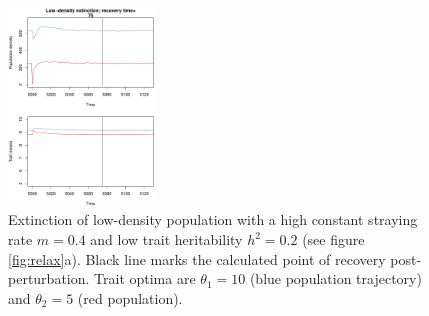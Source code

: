 \documentclass[twocolumn,preprintnumbers,amsmath,amssymb,superscriptaddress]{revtex4}
\newcommand{\beginsupplement}{%
        \clearpage
        \setcounter{table}{0}
        \renewcommand{\thetable}{S\arabic{table}}%
        \setcounter{figure}{0}
        \renewcommand{\thefigure}{S\arabic{figure}}%
     }
\begin{document}










\beginsupplement


\begin{figure}
  \captionsetup{justification=raggedright,
singlelinecheck=false
}
\centering
\includegraphics[width=0.35\textwidth]{figs2/fig_relax_small.pdf}
\caption{
Extinction of low-density population with a high constant straying rate $m=0.4$ and low trait heritability $h^2=0.2$ (see figure \ref{fig:relax}a).
Black line marks the calculated point of recovery post-perturbation.
Trait optima are $\theta_1 = 10$ (blue population trajectory) and $\theta_2 = 5$ (red population).
} \label{fig:relaxtraj_ldlh}
\end{figure}
\end{document}
